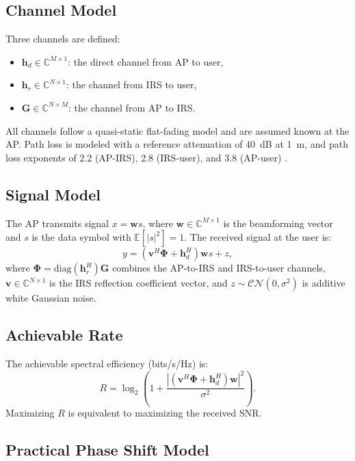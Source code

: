 \documentclass[12pt, a4paper]{article}
\newcommand{\vect}[1]{\mathbf{#1}}          %
\newcommand{\mat}[1]{\mathbf{#1}}           %
\newcommand{\abs}[1]{\left|#1\right|}       %
\begin{document}
\subsection{Channel Model}
Three channels are defined:
\begin{itemize}
    \item $\vect{h}_d \in \mathbb{C}^{M \times 1}$: the direct channel from AP to user,
    \item $\vect{h}_r \in \mathbb{C}^{N \times 1}$: the channel from IRS to user,
    \item $\mat{G} \in \mathbb{C}^{N \times M}$: the channel from AP to IRS.
\end{itemize}
All channels follow a quasi-static flat-fading model and are assumed known at the AP.
Path loss is modeled with a reference attenuation of 40~dB at 1~m, and path loss
exponents of 2.2 (AP-IRS), 2.8 (IRS-user), and 3.8 (AP-user) \cite{abeywickrama2020}.

\subsection{Signal Model}
The AP transmits signal $x = \vect{w}s$, where $\vect{w} \in \mathbb{C}^{M \times 1}$
is the beamforming vector and $s$ is the data symbol with $\mathbb{E}[|s|^2] = 1$.
The received signal at the user is:
\begin{equation}
    y = \left(\vect{v}^H \boldsymbol{\Phi} + \vect{h}_d^H\right)\vect{w}s + z,
    \label{eq:received_signal}
\end{equation}
where $\boldsymbol{\Phi} = \text{diag}(\vect{h}_r^H)\mat{G}$ combines the AP-to-IRS
and IRS-to-user channels, $\vect{v} \in \mathbb{C}^{N \times 1}$ is the IRS
reflection coefficient vector, and $z \sim \mathcal{CN}(0, \sigma^2)$ is
additive white Gaussian noise.

\subsection{Achievable Rate}
The achievable spectral efficiency (bits/s/Hz) is:
\begin{equation}
    R = \log_2\!\left(1 + \frac{\abs{(\vect{v}^H\boldsymbol{\Phi}
        + \vect{h}_d^H)\vect{w}}^2}{\sigma^2}\right).
    \label{eq:rate}
\end{equation}
Maximizing $R$ is equivalent to maximizing the received SNR.

\subsection{Practical Phase Shift Model}
\label{subsec:psm}
\end{document}
